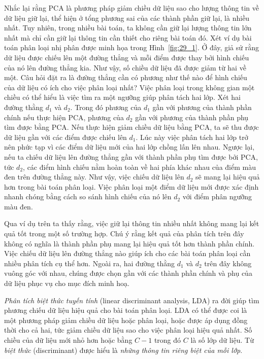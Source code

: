 Nhắc lại rằng PCA là phương pháp giảm chiều dữ liệu sao cho lượng thông tin về
dữ liệu giữ lại, thể hiện ở tổng phương sai của các thành phần giữ lại, 
 là nhiều nhất. Tuy nhiên, trong nhiều bài toán, ta không cần giữ lại lượng
thông tin lớn nhất mà chỉ cần giữ lại thông tin cần thiết cho riêng bài toán đó. 
Xét ví dụ bài toán phân loại nhị phân được minh họa trong Hình~\ref{fig:29_1}. %
Ở đây, giả sử rằng dữ liệu được chiếu lên một đường thẳng và mỗi điểm được
thay bởi hình chiếu của nó lên đường thẳng kia. Như vậy, số chiều dữ liệu đã
được giảm từ hai về một. Câu hỏi đặt ra là đường thẳng cần có phương như thế
nào để hình chiếu của dữ liệu {có ích cho việc
phân loại nhất}? Việc phân loại trong không gian một chiều có thể hiểu là việc tìm ra một
ngưỡng giúp phân tách hai lớp. Xét hai
đường thằng $d_1$ và $d_2$. Trong đó phương của $d_1$ gần với phương của thành
phần chính nếu thực hiện PCA, phương của $d_2$ gần với phương của thành phần phụ
tìm được bằng PCA. Nếu thực hiện giảm chiều dữ liệu bằng PCA, ta sẽ thu được dữ
liệu gần với các điểm được chiếu lên $d_1$. Lúc này việc phân tách hai lớp trở
nên phức tạp vì các điểm dữ liệu mới của hai lớp chồng lấn lên nhau. Ngược lại,
nếu ta chiếu dữ liệu lên đường thẳng gần với thành phần phụ tìm được bởi PCA,
tức $d_2$, các điểm hình chiếu nằm hoàn toàn về hai phía khác nhau của điểm màu
đen trên đường thẳng này. Như vậy, việc chiếu dữ liệu lên $d_2$ sẽ mang lại hiệu
quả hơn trong bài toán phân loại. Việc phân loại một điểm dữ liệu mới được xác
định nhanh chóng bằng cách so sánh hình chiếu của nó lên $d_2$ với điểm phân ngưỡng màu đen.

Qua ví dụ trên ta thấy rằng, {việc giữ lại thông tin nhiều nhất không mang lại
kết quả tốt trong một số trường hợp.} Chú ý rằng kết quả của phân tích trên
đây không có nghĩa là thành phần phụ mang lại hiệu quả tốt
hơn thành phần chính. Việc chiếu dữ liệu lên đường thẳng
nào giúp ích cho các bài toán phân loại cần nhiều phân tích cụ thể hơn.
Ngoài ra, hai đường thằng $d_1$ và $d_2$ trên đây không vuông góc với nhau,
chúng được chọn gần với các thành phần chính và phụ của dữ liệu phục vụ cho mục
đích minh hoạ. 

\textit{Phân tích biệt thức tuyến tính} (linear discriminant analysis, LDA) ra đời giúp tìm phương chiếu dữ liệu
hiệu quả cho bài toán phân loại. LDA có thể được coi là một phương pháp giảm
chiều dữ liệu hoặc phân loại, hoặc
được áp dụng đồng thời cho cả hai, tức giảm chiều dữ liệu sao cho việc phân loại
hiệu quả nhất. Số chiều của dữ liệu mới nhỏ hơn hoặc bằng $C-1$ trong đó $C$
là số lớp dữ liệu. Từ \textit{biệt thức} ({discriminant}) được hiểu là \textit{những
thông tin riêng biệt của mỗi lớp}. 
  
